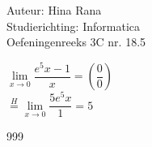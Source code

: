 \documentclass[a4paper]{article}
\begin{document}
\noindent \large Auteur: Hina Rana \\
\noindent \large Studierichting: Informatica\\
\noindent \large Oefeningenreeks 3C nr. 18.5\\

\medskip

\normalsize
$\lim\limits_{x \to 0} \dfrac{e^5x-1}{x}= \left(\dfrac{0}{0}\right)$\\

$\stackrel{H}{=} \lim\limits_{x \to 0} \dfrac{5e^5x}{1} = 5$\\


\begin{thebibliography}{999}
\end{thebibliography}
\end{document}
